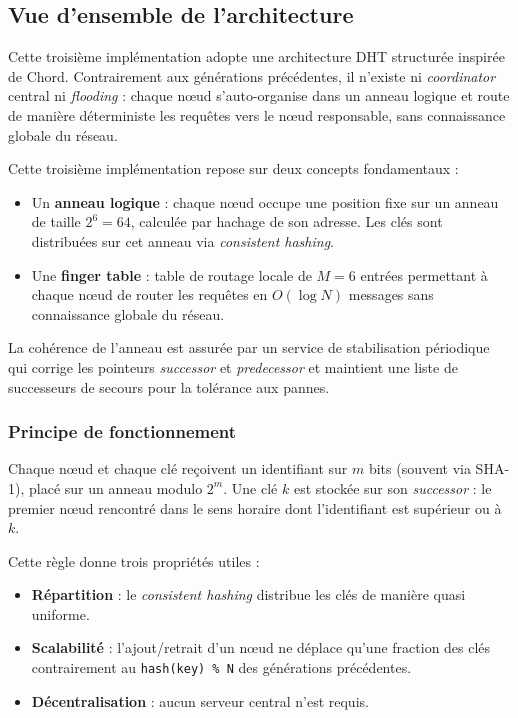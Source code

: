 \subsection{Vue d'ensemble de l'architecture}

Cette troisi\`eme impl\'ementation adopte une architecture DHT structur\'ee inspir\'ee de Chord. Contrairement aux g\'en\'erations pr\'ec\'edentes, il n'existe ni \emph{coordinator} central ni \emph{flooding} : chaque n\oe ud s'auto-organise dans un anneau logique et route de mani\`ere d\'eterministe les requ\^etes vers le n\oe ud responsable, sans connaissance globale du r\'eseau.

Cette troisi\`eme impl\'ementation repose sur deux concepts fondamentaux :
\begin{itemize}
    \item Un \textbf{anneau logique} : chaque n\oe ud occupe une position fixe sur un anneau de taille \(2^6 = 64\), calcul\'ee par hachage de son adresse. Les cl\'es sont distribu\'ees sur cet anneau via \emph{consistent hashing}.
    \item Une \textbf{finger table} : table de routage locale de \(M = 6\) entr\'ees permettant \`a chaque n\oe ud de router les requ\^etes en \(O(\log N)\) messages sans connaissance globale du r\'eseau.
\end{itemize}
La coh\'erence de l'anneau est assur\'ee par un service de stabilisation p\'eriodique qui corrige les pointeurs \emph{successor} et \emph{predecessor} et maintient une liste de successeurs de secours pour la tol\'erance aux pannes.

\subsubsection{Principe de fonctionnement}

Chaque n\oe ud et chaque cl\'e re\c coivent un identifiant sur \(m\) bits (souvent via SHA-1), plac\'e sur un anneau modulo \(2^m\). Une cl\'e \(k\) est stock\'ee sur son \emph{successor} : le premier n\oe ud rencontr\'e dans le sens horaire dont l'identifiant est sup\'erieur ou \`a \(k\).

Cette r\`egle donne trois propri\'et\'es utiles :
\begin{itemize}
\item \textbf{R\'epartition} : le \emph{consistent hashing} distribue les cl\'es de mani\`ere quasi uniforme.
\item \textbf{Scalabilit\'e} : l'ajout/retrait d'un n\oe ud ne d\'eplace qu'une fraction des cl\'es contrairement au \texttt{hash(key) \% N} des g\'en\'erations pr\'ec\'edentes.
\item \textbf{D\'ecentralisation} : aucun serveur central n'est requis.
\end{itemize}

